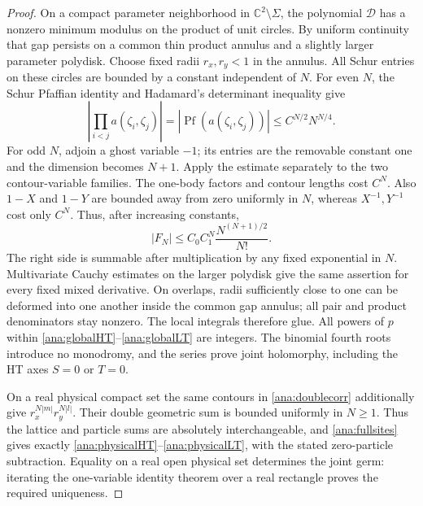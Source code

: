 \documentclass[11pt]{article}
\numberwithin{equation}{section}
\theoremstyle{definition}
\newcommand{\C}{\mathbb C}
\begin{document}
\begin{proof}
On a compact parameter neighborhood in \(\C^2\setminus\Sigma\),
the polynomial \(\mathcal D\) has a nonzero minimum modulus on the
product of unit circles. By uniform continuity that gap persists on
a common thin product annulus and a slightly larger parameter
polydisk. Choose fixed radii \(r_x,r_y<1\) in the annulus.
All Schur entries on these circles are bounded by a constant
independent of \(N\). For even \(N\), the Schur Pfaffian identity
and Hadamard's determinant inequality give
\[
 \left|\prod_{i<j}a(\zeta_i,\zeta_j)\right|
 =|\operatorname{Pf}(a(\zeta_i,\zeta_j))|
 \le C^{N/2}N^{N/4}.
\]
For odd \(N\), adjoin a ghost variable \(-1\); its entries are
the removable constant one and the dimension becomes \(N+1\).
Apply the estimate separately to the two contour-variable families.
The one-body factors and contour lengths cost \(C^N\).
Also \(1-X\) and \(1-Y\) are bounded away from zero uniformly in
\(N\), whereas \(X^{-1},Y^{-1}\) cost only \(C^N\).
Thus, after increasing constants,
\begin{equation}\label{ana:compactbound}
 |F_N|\le C_0 C_1^N\frac{N^{(N+1)/2}}{N!}.
\end{equation}
The right side is summable after multiplication by any fixed
exponential in \(N\). Multivariate Cauchy estimates on the larger
polydisk give the same assertion for every fixed mixed derivative.
On overlaps, radii sufficiently close to one can be deformed into
one another inside the common gap annulus; all pair and product
denominators stay nonzero. The local integrals therefore glue.
All powers of \(p\) within \eqref{ana:globalHT}--\eqref{ana:globalLT}
are integers. The binomial fourth roots introduce no monodromy,
and the series prove joint holomorphy, including the HT axes
\(S=0\) or \(T=0\).

On a real physical compact set the same contours in
\eqref{ana:doublecorr} additionally give
\(r_x^{N|m|}r_y^{N|l|}\). Their double geometric sum is bounded
uniformly in \(N\ge1\). Thus the lattice and particle sums are
absolutely interchangeable, and \eqref{ana:fullsites} gives exactly
\eqref{ana:physicalHT}--\eqref{ana:physicalLT}, with the stated
zero-particle subtraction. Equality on a real open physical set
determines the joint germ: iterating the one-variable identity
theorem over a real rectangle proves the required uniqueness.
\end{proof}
\end{document}
